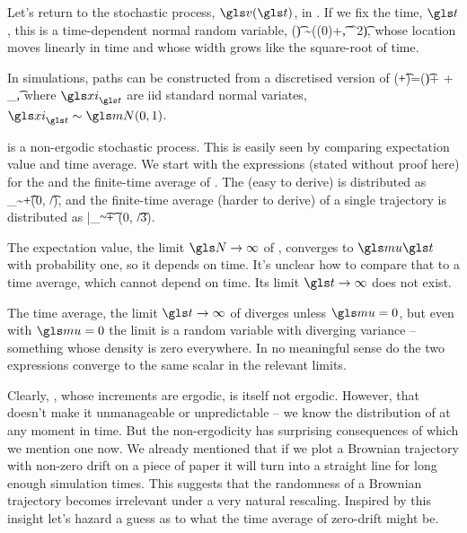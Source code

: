 Let's return to the stochastic process, $\gv(\t)$, in . If we fix the time, $\t$, this is a time-dependent normal random variable,
\be
\gv(\t) \sim \mN(\gv(0)+\gmu\t, \gsigma^2\t),
\ee
whose location moves linearly in time and whose width grows like the square-root of time. 

In simulations, \BM paths can be constructed from a discretised version of 
\be
\gv(\t+\dt)=\gv(\t)+ \gmu \dt + \gsigma \sqrt{\dt} \gxi_\t,
\ee
where $\gxi_\t$ are iid standard normal variates, $\gxi_\t\sim\mN(0,1)$.

\BM is a non-ergodic stochastic process. This is easily seen by comparing expectation value and time average. We start with the expressions (stated without proof here) for the \FEA and the finite-time average of \BM. The \FEA (easy to derive) is distributed as
\be
\ave{\gv(\t)}_\N \sim \gmu \t+\mN(0, \t/\N),
\ee
and the finite-time average (harder to derive) of a single \BM trajectory is distributed as
\be
\bar{\gv}_\t \sim \gmu \t + \gsigma \mN(0, \t/3).
\ee

The expectation value, \ie the limit $\N\to\infty$ of , converges to $\gmu \t$ with probability  one, so it depends on time. It's unclear how to compare that to a time average, which cannot depend on time. Its limit $\t\to\infty$ does not exist.

The time average, the limit $\t\to\infty $ of  diverges unless $\gmu=0$, but even with $\gmu=0$ the limit is a random variable with diverging variance -- something whose density 
is zero everywhere. In no meaningful sense do the two expressions converge to the same scalar in the relevant limits.

Clearly, \BM, whose increments are ergodic, is itself not ergodic. However, that doesn't make it unmanageable or unpredictable -- we know the distribution of \BM at any moment in time. But the non-ergodicity has surprising consequences of which we mention one now. We already mentioned that if we plot a Brownian trajectory with non-zero drift on a piece of paper it will turn into a straight line for long enough simulation times. This suggests that the randomness of a Brownian trajectory becomes irrelevant under a very natural rescaling. Inspired by this insight let's hazard a guess as to what the time average of zero-drift \BM might be. 

